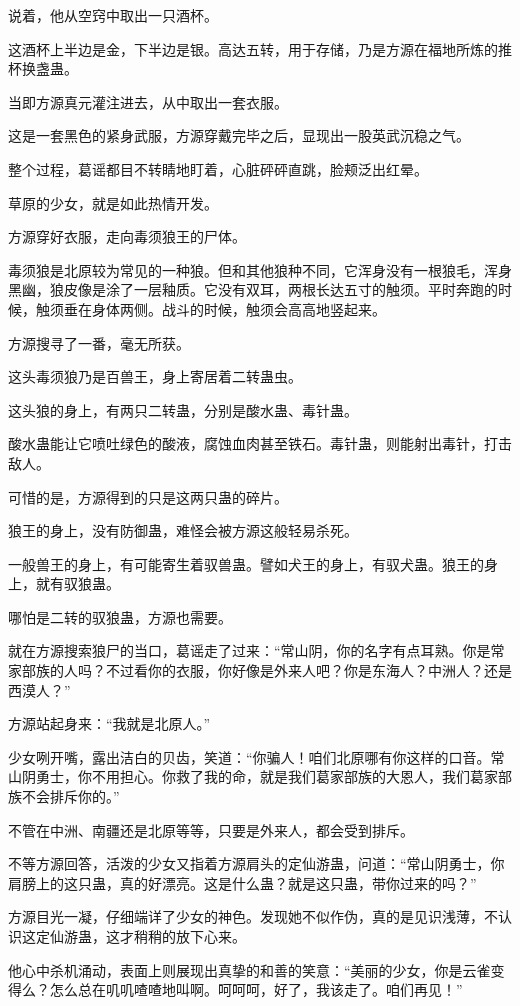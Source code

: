 \begin{this_body}
说着，他从空窍中取出一只酒杯。

这酒杯上半边是金，下半边是银。高达五转，用于存储，乃是方源在福地所炼的推杯换盏蛊。

当即方源真元灌注进去，从中取出一套衣服。

这是一套黑色的紧身武服，方源穿戴完毕之后，显现出一股英武沉稳之气。

整个过程，葛谣都目不转睛地盯着，心脏砰砰直跳，脸颊泛出红晕。

草原的少女，就是如此热情开发。

方源穿好衣服，走向毒须狼王的尸体。

毒须狼是北原较为常见的一种狼。但和其他狼种不同，它浑身没有一根狼毛，浑身黑幽，狼皮像是涂了一层釉质。它没有双耳，两根长达五寸的触须。平时奔跑的时候，触须垂在身体两侧。战斗的时候，触须会高高地竖起来。

方源搜寻了一番，毫无所获。

这头毒须狼乃是百兽王，身上寄居着二转蛊虫。

这头狼的身上，有两只二转蛊，分别是酸水蛊、毒针蛊。

酸水蛊能让它喷吐绿色的酸液，腐蚀血肉甚至铁石。毒针蛊，则能射出毒针，打击敌人。

可惜的是，方源得到的只是这两只蛊的碎片。

狼王的身上，没有防御蛊，难怪会被方源这般轻易杀死。

一般兽王的身上，有可能寄生着驭兽蛊。譬如犬王的身上，有驭犬蛊。狼王的身上，就有驭狼蛊。

哪怕是二转的驭狼蛊，方源也需要。

就在方源搜索狼尸的当口，葛谣走了过来：“常山阴，你的名字有点耳熟。你是常家部族的人吗？不过看你的衣服，你好像是外来人吧？你是东海人？中洲人？还是西漠人？”

方源站起身来：“我就是北原人。”

少女咧开嘴，露出洁白的贝齿，笑道：“你骗人！咱们北原哪有你这样的口音。常山阴勇士，你不用担心。你救了我的命，就是我们葛家部族的大恩人，我们葛家部族不会排斥你的。”

不管在中洲、南疆还是北原等等，只要是外来人，都会受到排斥。

不等方源回答，活泼的少女又指着方源肩头的定仙游蛊，问道：“常山阴勇士，你肩膀上的这只蛊，真的好漂亮。这是什么蛊？就是这只蛊，带你过来的吗？”

方源目光一凝，仔细端详了少女的神色。发现她不似作伪，真的是见识浅薄，不认识这定仙游蛊，这才稍稍的放下心来。

他心中杀机涌动，表面上则展现出真挚的和善的笑意：“美丽的少女，你是云雀变得么？怎么总在叽叽喳喳地叫啊。呵呵呵，好了，我该走了。咱们再见！”


\end{this_body}
